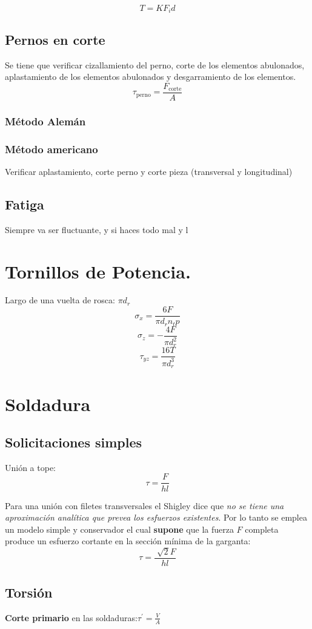 \documentclass[twocolumn,10pt]{article}
\begin{document}
$$T=KF_id $$
\subsection{Pernos en corte}
Se tiene que verificar cizallamiento del perno, corte  de los elementos abulonados, aplastamiento de los elementos abulonados y desgarramiento de los elementos.
$$\tau_{\textrm{perno}}=\frac{F_{\textrm{corte}}}{A}$$
\subsubsection{Método Alemán}
\subsubsection{Método americano}
Verificar aplastamiento, corte perno y corte pieza (transversal y longitudinal)
\subsection{Fatiga}
Siempre va ser fluctuante, y si haces todo mal y l
\section{Tornillos de Potencia.}
Largo de una vuelta de rosca: $\pi d_r$ 
$$ \sigma_x=\frac{6F}{\pi d_r n_t p}$$
$$\sigma_z=-\frac{4F}{\pi d_r^2} $$
$$\tau_{yz}= \frac{16T}{\pi d^3_r} $$

\section{Soldadura}
\subsection{Solicitaciones simples}
Unión a tope:
$$\tau=\frac{F}{hl} $$

Para una unión con filetes transversales el Shigley dice que \emph{no se tiene una aproximación analítica que prevea los esfuerzos existentes}. Por lo tanto se emplea un modelo simple y conservador el cual \textbf{supone} que la fuerza $F$ completa produce un esfuerzo cortante en la sección mínima de la garganta:
$$\tau=\frac{\sqrt[]{2}F}{hl} $$
\subsection{Torsión}
\textbf{Corte primario} en las soldaduras:$\tau^\prime = \frac{V}{A} $
\end{document}
